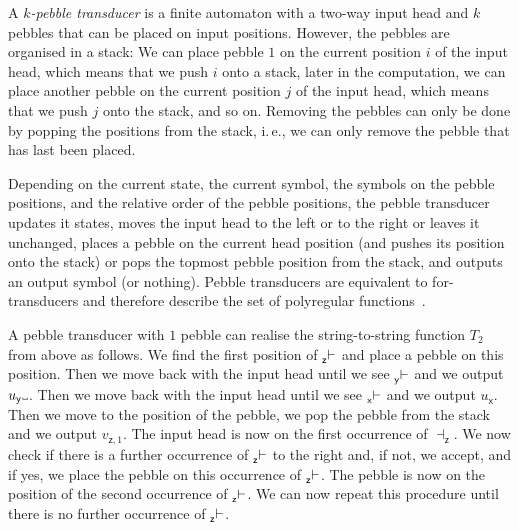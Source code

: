 \documentclass[
a4paper
]{article}
\theoremstyle{plain}
\theoremstyle{definition}
\theoremstyle{remark}
\newcommand\Vtextvisiblespace[1][.3em]{%
	\mbox{\kern.06em\vrule height.3ex}%
	\vbox{\hrule width#1}%
	\hbox{\vrule height.3ex}}
\DeclareMathOperator{\openmark}{\vdash}
\DeclareMathOperator{\closemark}{\dashv}
\newcommand{\open}[1]{\prescript{}{#1}{\openmark}}
\newcommand{\close}[1]{\closemark_{#1}}
\newcommand{\varsx}{\ensuremath{\textsf{x}}}
\newcommand{\varsy}{\ensuremath{\textsf{y}}}
\newcommand{\varsz}{\ensuremath{\textsf{z}}}
\begin{document}
A \emph{$k$-pebble transducer} is a finite automaton with a two-way input head and $k$ pebbles that can be placed on input positions. However, the pebbles are organised in a stack: We can place pebble $1$ on the current position $i$ of the input head, which means that we push $i$ onto a stack, later in the computation, we can place another pebble on the current position $j$ of the input head, which means that we push $j$ onto the stack, and so on. Removing the pebbles can only be done by popping the positions from the stack, i.\,e., we can only remove the pebble that has last been placed. 

Depending on the current state, the current symbol, the symbols on the pebble positions, and the relative order of the pebble positions, the pebble transducer updates it states, moves the input head to the left or to the right or leaves it unchanged, places a pebble on the current head position (and pushes its position onto the stack) or pops the topmost pebble position from the stack, and outputs an output symbol (or nothing). Pebble transducers are equivalent to for-transducers and therefore describe the set of polyregular functions~\cite{engelfriet2002two,Bojanczyk22}.

A pebble transducer with $1$ pebble can realise the string-to-string function $T_2$ from above as follows. We find the first position of $\open{\varsz}$ and place a pebble on this position. Then we move back with the input head until we see $\open{\varsy}$ and we output $u_{\varsy} \Vtextvisiblespace$. Then we move back with the input head until we see $\open{\varsx}$ and we output $u_{\varsx}$. Then we move to the position of the pebble, we pop the pebble from the stack and we output $v_{\varsz, 1}$. The input head is now on the first occurrence of $\close{\varsz}$. We now check if there is a further occurrence of $\open{\varsz}$ to the right and, if not, we accept, and if yes, we place the pebble on this occurrence of $\open{\varsz}$. The pebble is now on the position of the second occurrence of $\open{\varsz}$. We can now repeat this procedure until there is no further occurrence of $\open{\varsz}$.
\end{document}
